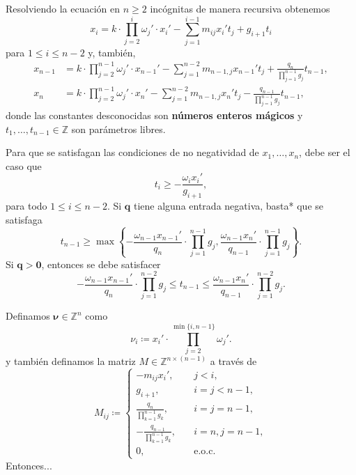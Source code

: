 \documentclass[aspectratio=169,professionalfonts]{beamer}
\newcommand{\Z}{\mathbb{Z}}
\renewcommand{\vec}[1]{\boldsymbol{#1}}
\begin{document}
\begin{frame}
	Resolviendo la ecuación en $n \geq 2$ incógnitas de manera recursiva obtenemos
	\begin{equation*}
		x_i 
			= k \cdot \prod_{j=2}^{i}\omega_j' \cdot x_i' - \sum_{j=1}^{i - 1}m_{ij}x_i'
			t_j + g_{i + 1}t_i
	\end{equation*}
	para $1 \leq i \leq n - 2$ y, también,
	\begin{align*}
		x_{n-1} &= k \cdot \prod_{j=2}^{n-1} \omega_j' \cdot x_{n-1}' - \sum_{j=1}^{n-2}
		m_{n-1,j}x_{n-1}' t_j + \frac{q_n}{\prod_{j=1}^{n-1}g_j} t_{n-1}, \\
		x_{n} &= k \cdot \prod_{j=2}^{n-1} \omega_j' \cdot x_{n}' - \sum_{j=1}^{n-2}
		m_{n-1,j}x_{n}' t_j - \frac{q_{n - 1}}{\prod_{j=1}^{n-1}g_j} t_{n-1},
	\end{align*}
	donde las constantes desconocidas son \textbf{números enteros mágicos} y
	$t_1, \ldots, t_{n-1} \in \Z$ son parámetros libres.
\end{frame}

\begin{frame}
	Para que se satisfagan las condiciones de no negatividad de $x_1, \ldots,
	x_n$, debe ser el caso que
	\begin{equation*}
		t_i \geq -\frac{\omega_ix_i'}{g_{i + 1}},
	\end{equation*}
	para todo $1 \leq i \leq n - 2$.
	Si $\vec{q}$ tiene alguna entrada negativa, basta* que se satisfaga
	\begin{equation*}
		t_{n-1} \geq \max\left\lbrace
			-\frac{\omega_{n-1}x_{n-1}'}{q_n} \cdot \prod_{j=1}^{n-1}g_j,
			\frac{\omega_{n-1}x_{n}'}{q_{n-1}} \cdot \prod_{j=1}^{n-1}g_j
		\right\rbrace.
	\end{equation*}
	Si $\vec{q} > \vec{0}$, entonces se debe satisfacer
	\begin{equation*}
		-\frac{\omega_{n-1}x_{n-1}'}{q_n} \cdot \prod_{j=1}^{n-2}g_j
		\leq
		t_{n - 1}
		\leq
		\frac{\omega_{n-1}x_{n}'}{q_{n-1}} \cdot \prod_{j=1}^{n-2}g_j.
	\end{equation*}
\end{frame}

\begin{frame}
	Definamos $\vec{\nu} \in \Z^n$ como
	\begin{equation*}
		\nu_i \coloneq x_i' \cdot \prod_{j = 2}^{\min{\lbrace i, n - 1 \rbrace}}\omega_j'.
	\end{equation*}
	y también definamos la matriz $M \in \Z^{n \times (n - 1)}$ a través de
	\begin{equation*}
		M_{ij} \coloneq \begin{cases}
			-m_{ij}x_i', &\quad j < i, \\
			g_{i + 1},  &\quad i = j < n - 1, \\
			\frac{q_n}{\prod_{k=1}^{n-1}g_k}, &\quad i = j = n - 1, \\
			-\frac{q_{n-1}}{\prod_{k=1}^{n-1}g_k}, &\quad i = n, j = n - 1, \\
			0, &\quad \text{e.o.c.}
		\end{cases}
	\end{equation*}
	Entonces...
\end{frame}
\end{document}
